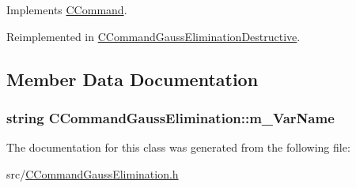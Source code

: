 Implements \hyperlink{classCCommand_ad9361ea814093c4ebecf22bb0a3f8b79}{C\+Command}.



Reimplemented in \hyperlink{classCCommandGaussEliminationDestructive_a6bb98f06cdb90b5dbe129286d7d08cc7}{C\+Command\+Gauss\+Elimination\+Destructive}.



\subsection{Member Data Documentation}
\subsubsection[{\texorpdfstring{m\+\_\+\+Var\+Name}{m_VarName}}]{\setlength{\rightskip}{0pt plus 5cm}string C\+Command\+Gauss\+Elimination\+::m\+\_\+\+Var\+Name\hspace{0.3cm}{\ttfamily [protected]}}\hypertarget{classCCommandGaussElimination_a2e619e3d9fb79bca7076ab72c21c09b4}{}\label{classCCommandGaussElimination_a2e619e3d9fb79bca7076ab72c21c09b4}


The documentation for this class was generated from the following file\+:\begin{DoxyCompactItemize}
\item 
src/\hyperlink{CCommandGaussElimination_8h}{C\+Command\+Gauss\+Elimination.\+h}\end{DoxyCompactItemize}
